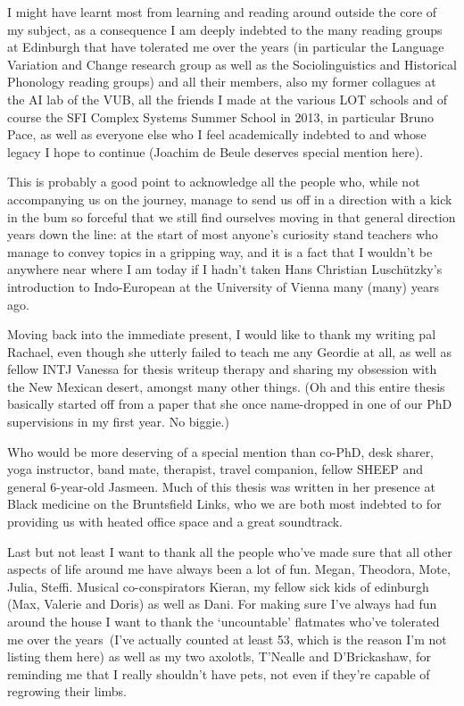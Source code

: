 \documentclass[oneside]{book}
\begin{document}
I might have learnt most from learning and reading around outside the core of my subject, as a consequence I am deeply indebted to the many reading groups at Edinburgh that have tolerated me over the years (in particular the Language Variation and Change research group as well as the Sociolinguistics and Historical Phonology reading groups) and all their members, also my former collagues at the AI lab of the VUB, all the friends I made at the various LOT schools and of course the SFI Complex Systems Summer School in 2013, in particular Bruno Pace, as well as everyone else who I feel academically indebted to and whose legacy I hope to continue (Joachim de Beule deserves special mention here).

This is probably a good point to acknowledge all the people who, while not accompanying us on the journey, manage to send us off in a direction with a kick in the bum so forceful that we still find ourselves moving in that general direction years down the line: at the start of most anyone's curiosity stand teachers who manage to convey topics in a gripping way, and it is a fact that I wouldn't be anywhere near where I am today if I hadn't taken Hans Christian Luschützky's introduction to Indo-European at the University of Vienna many (many) years ago. %

Moving back into the immediate present, I would like to thank my writing pal Rachael, even though she utterly failed to teach me any Geordie at all, as well as fellow INTJ Vanessa for thesis writeup therapy and sharing my obsession with the New Mexican desert, amongst many other things. (Oh and this entire thesis basically started off from a paper that she once name-dropped in one of our PhD supervisions in my first year. No biggie.)

Who would be more deserving of a special mention than co-PhD, desk sharer, yoga instructor, band mate, therapist, travel companion, fellow SHEEP and general 6-year-old Jasmeen. Much of this thesis was written in her presence at Black medicine on the Bruntsfield Links, who we are both most indebted to for providing us with heated office space and a great soundtrack.

Last but not least I want to thank all the people who've made sure that all other aspects of life around me have always been a lot of fun. Megan, Theodora, Mote, Julia, Steffi.
Musical co-conspirators Kieran, my fellow sick kids of edinburgh (Max, Valerie and Doris) as well as Dani. %
For making sure I've always had fun around the house I want to thank the `uncountable' flatmates who've tolerated me over the years~(I've actually counted at least 53, which is the reason I'm not listing them here) as well as my two axolotls, T'Nealle and D'Brickashaw, for reminding me that I really shouldn't have pets, not even if they're capable of regrowing their limbs.
\end{document}
